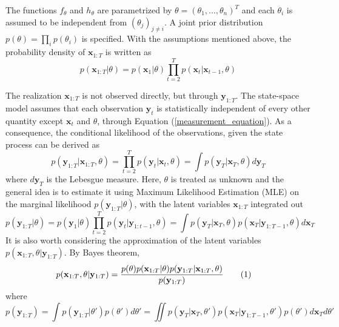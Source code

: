 \documentclass[11pt,a4,twosided,singlespacing,titlepagenumber=on]{scrreprt}
\numberwithin{equation}{chapter} %
\theoremstyle{remark}
\newcommand{\matr}[1]{\mathbf{#1}}
\newcommand\numberthis{\addtocounter{equation}{1}\tag{\theequation}}
\begin{document}
The functions $f_\theta$ and $h_\theta$ are parametrized by $\theta = (\theta_1,...,\theta_n)^T$ and each $\theta_i$ is assumed to be independent from $(\theta_j)_{j \neq i}$. A joint prior distribution $p(\theta) = \prod_i p(\theta_i)$ is specified. With the assumptions mentioned above, the probability density of $\matr{x}_{1:T}$ is written as
\begin{equation}
p(\matr{x}_{1:T} | \theta) = p(\matr{x}_1|\theta) \prod_{t=2}^T p(\matr{x}_t|\matr{x}_{t-1}, \theta) 
\end{equation}

The realization $\matr{x}_{1:T}$ is not observed directly, but through $\matr{y}_{1:T}$. The state-space model assumes that each observation $\matr{y}_t$ is statistically independent of every other quantity except $\matr{x}_t$ and $\theta$, through Equation (\ref{measurement_equation}). As a consequence, the conditional likelihood of the observations, given the state process can be derived as
\begin{equation}
p(\matr{y}_{1:T} | \matr{x}_{1:T}, \theta) = \prod_{t=2}^T p(\matr{y}_t | \matr{x}_t, \theta) = \int p(\matr{y}_T|\matr{x}_T, \theta) d\matr{y}_T
\end{equation}
where $d \matr{y}_T$ is the Lebesgue measure. Here, $\theta$ is treated as unknown and the general idea is to estimate it using Maximum Likelihood Estimation (MLE) on the marginal likelihood $p(\matr{y}_{1:T}|\theta)$, with the latent variables $\matr{x}_{1:T}$ integrated out
\begin{equation}
p(\matr{y}_{1:T} | \theta) = p(\matr{y}_1 |\theta) \prod_{t=2}^T p(\matr{y}_t | \matr{y}_{1:t-1}, \theta) = \int p(\matr{y}_T|\matr{x}_T, \theta) p(\matr{x}_T|\matr{y}_{1:T-1}, \theta) d \matr{x}_T\label{intractable_ssm_2}
\end{equation}
It is also worth considering the approximation of the latent variables $p(\matr{x}_{1:T}, \theta | \matr{y}_{1:T})$. By Bayes theorem,
\begin{align*}
p(\matr{x}_{1:T}, \theta | \matr{y}_{1:T}) &= \frac{ p(\theta)p(\matr{x}_{1:T}|\theta)p(\matr{y}_{1:T}|\matr{x}_{1:T}, \theta) }{p(\matr{y}_{1:T})}\numberthis \label{intractable_ssm}
\end{align*}
where
\begin{equation}
p(\matr{y}_{1:T}) = \int p(\matr{y}_{1:T}|\theta')p(\theta') d\theta' = \iint p(\matr{y}_T|\matr{x}_T, \theta') p(\matr{x}_T|\matr{y}_{1:T-1}, \theta') p(\theta') d \matr{x}_T d\theta'
\end{equation}
\end{document}
